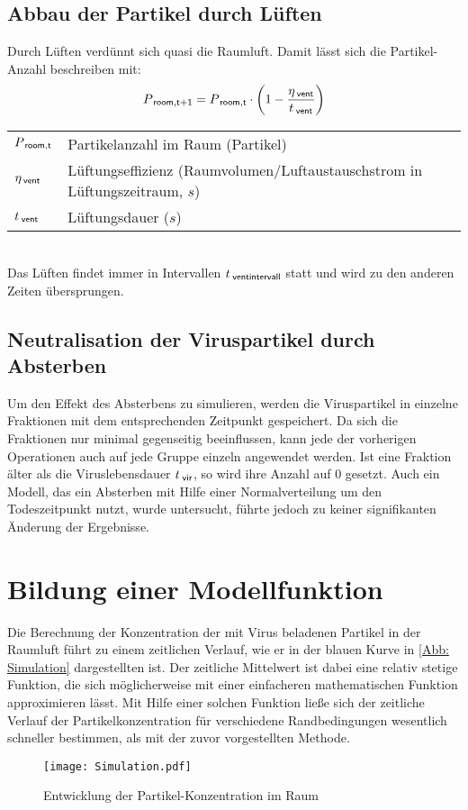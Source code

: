 \documentclass[12pt,a4paper,bibtotocnumbered,liststotocnumbered]{scrreprt}
\begin{document}
\subsection{Abbau der Partikel durch Lüften}
Durch Lüften verdünnt sich quasi die Raumluft. Damit lässt sich die Partikel-Anzahl beschreiben mit:
\begin{align}
P_{\: \mathsf{room,t+1}} = P_{\: \mathsf{room,t}} \cdot \left( 1 -  \frac{\eta_{\: \mathsf{vent}}}{t_{\: \mathsf{vent}}}\right)
\end{align}
\begin{tabular}{ll}
$P_{\: \mathsf{room,t}} $ & Partikelanzahl im Raum (Partikel)\\
$\eta_{\: \mathsf{vent}}$ & Lüftungseffizienz (Raumvolumen/Luftaustauschstrom in Lüftungszeitraum, $s$)\\
$t_{\: \mathsf{vent}} $ & Lüftungsdauer ($s$)\\
\end{tabular}\\
Das Lüften findet immer in Intervallen $t_{\: \mathsf{ventintervall}} $ statt und wird zu den anderen Zeiten übersprungen.

\subsection{Neutralisation der Viruspartikel durch Absterben}
Um den Effekt des Absterbens zu simulieren, werden die Viruspartikel in einzelne Fraktionen mit dem entsprechenden Zeitpunkt gespeichert. Da sich die Fraktionen nur minimal gegenseitig beeinflussen, kann jede der vorherigen Operationen auch auf jede Gruppe einzeln angewendet werden. Ist eine Fraktion älter als die Viruslebensdauer $t_{\: \mathsf{vir}}$, so wird ihre Anzahl auf 0 gesetzt. Auch ein Modell, das ein Absterben mit Hilfe einer Normalverteilung um den Todeszeitpunkt nutzt, wurde untersucht, führte jedoch zu keiner signifikanten Änderung der Ergebnisse. 

\section{Bildung einer Modellfunktion}
Die Berechnung der Konzentration der mit Virus beladenen Partikel in der Raumluft führt zu einem zeitlichen Verlauf, wie er in der blauen Kurve in \autoref{Abb: Simulation} dargestellten ist. Der zeitliche Mittelwert ist dabei eine relativ stetige Funktion, die sich möglicherweise mit einer einfacheren mathematischen Funktion approximieren lässt. Mit Hilfe einer solchen Funktion ließe sich der zeitliche Verlauf der Partikelkonzentration für verschiedene Randbedingungen wesentlich schneller bestimmen, als mit der zuvor vorgestellten Methode.
\begin{figure}[H]
\begin{center}
\texttt{[image: Simulation.pdf]}
\caption{Entwicklung der Partikel-Konzentration im Raum}
\label{Abb: Simulation}
\end{center}
\end{figure}
\end{document}
